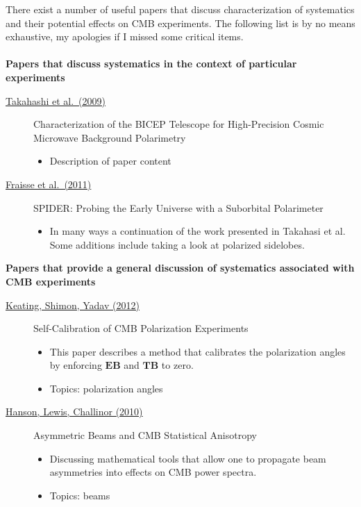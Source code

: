There exist a number of useful papers that discuss characterization of systematics and their potential effects on CMB experiments. The following list is by no means exhaustive, my apologies if I missed some critical items.
\\ \\
\textbf{Papers that discuss systematics in the context of particular experiments}
\begin{description}

\item[\href{https://arxiv.org/abs/0906.4069}{Takahashi et al.\ (2009)}] Characterization of the BICEP Telescope for High-Precision Cosmic Microwave Background Polarimetry
\begin{itemize}[noitemsep]
\item Description of paper content
\end{itemize}

\item[\href{https://arxiv.org/abs/1106.3087}{Fraisse et al.\ (2011)}] SPIDER: Probing the Early Universe with a Suborbital Polarimeter
\begin{itemize}[noitemsep]
\item In many ways a continuation of the work presented in Takahasi et al. Some additions include taking a look at polarized sidelobes.
\end{itemize}


\end{description}

\noindent \textbf{Papers that provide a general discussion of systematics associated with CMB experiments}
\begin{description}

\item[\href{https://arxiv.org/abs/1211.5734}{Keating, Shimon, Yadav (2012)}] Self-Calibration of CMB Polarization Experiments
\begin{itemize}[noitemsep]
\item This paper describes a method that calibrates the polarization angles by enforcing $\mathbf{EB}$ and $\mathbf{TB}$ to zero.
\item Topics: polarization angles
\end{itemize}

\item[\href{https://arxiv.org/abs/1003.0198}{Hanson, Lewis, Challinor (2010)}] Asymmetric Beams and CMB Statistical Anisotropy
\begin{itemize}[noitemsep]
\item Discussing mathematical tools that allow one to propagate beam asymmetries into effects on CMB power spectra.
\item Topics: beams
\end{itemize}



\end{description}
